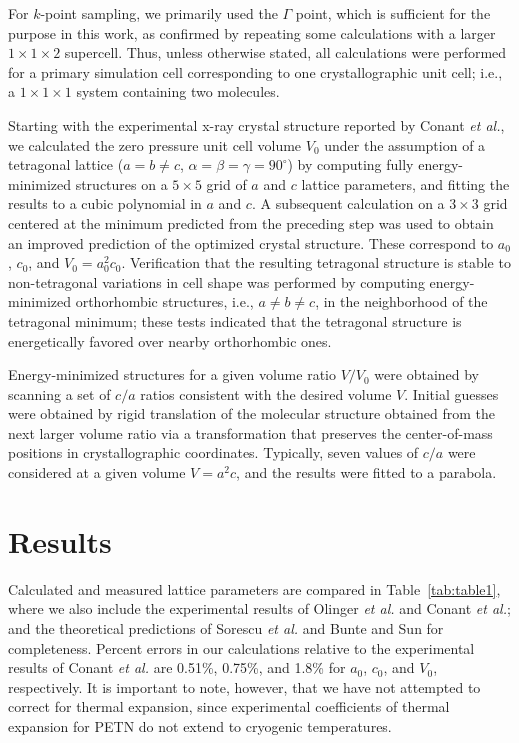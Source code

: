 \documentclass[prb,aps,nobibnotes,twocolumn,doublespace,twocolumngrid,superbib]{revtex4}
\begin{document}
For $k$-point sampling, we primarily used the $\Gamma$ point, which is
sufficient for the purpose in this work, as confirmed by repeating
some calculations with a larger $1 \times 1 \times 2 $ supercell.
Thus, unless otherwise stated, all calculations were performed for a
primary simulation cell corresponding to one crystallographic unit
cell; i.e., a $1\times 1\times 1 $ system containing two molecules.

Starting with the experimental x-ray crystal structure reported by
Conant {\it et al.},\cite{Conant_1979} we calculated the zero pressure
unit cell volume $V_0$ under the assumption of a tetragonal lattice
($a=b\neq c$, $\alpha=\beta=\gamma=90^\circ$) by computing fully
energy-minimized structures on a $5\times 5$ grid of $a$ and $c$
lattice parameters, and fitting the results to a cubic polynomial in
$a$ and $c$.  A subsequent calculation on a $3 \times 3$ grid centered
at the minimum predicted from the preceding step was used to obtain an
improved prediction of the optimized crystal structure.  These
correspond to $a_0$, $c_0$, and $V_0=a_0^2c_0$.  Verification that the
resulting tetragonal structure is stable to non-tetragonal variations
in cell shape was performed by computing energy-minimized orthorhombic
structures, i.e., $a\neq b\neq c$, in the neighborhood of the
tetragonal minimum; these tests indicated that the tetragonal
structure is energetically favored over nearby orthorhombic ones.

Energy-minimized structures for a given volume ratio $V/V_0$ were
obtained by scanning a set of $c/a$ ratios consistent with the desired
volume $V$.  Initial guesses were obtained by rigid translation of the
molecular structure obtained from the next larger volume ratio via a
transformation that preserves the center-of-mass positions in
crystallographic coordinates.  Typically, seven values of $c/a$ were
considered at a given volume $V=a^2c$, and the results were fitted to
a parabola.

\section{Results}
\label{sec:results}
Calculated and measured lattice parameters are compared in
Table~\ref{tab:table1}, where we also include the experimental results
of Olinger {\it et al.}\cite{Olinger_1975v62} and Conant {\it et
al.}\cite{Conant_1979}; and the theoretical predictions of Sorescu
{\it et al.}\cite{Sorescu_1999v103} and Bunte and
Sun\cite{Bunte_2000v104} for completeness.  Percent errors in our
calculations relative to the experimental results of Conant {\it et
al.}\cite{Conant_1979} are 0.51\%, 0.75\%, and 1.8\% for $a_0$, $c_0$,
and $V_0$, respectively.  It is important to note, however, that we
have not attempted to correct for thermal expansion, since
experimental coefficients of thermal expansion for PETN do not extend
to cryogenic temperatures.
\end{document}

